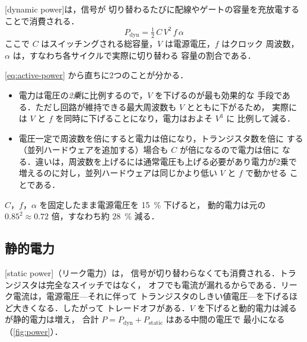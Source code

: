 \documentclass[../main.tex]{subfiles}
\begin{document}
[dynamic power]は，信号が
切り替わるたびに配線やゲートの容量を充放電することで消費される．
\begin{equation}
  P_{\mathrm{dyn}} = \tfrac{1}{2}\, C\, V^{2}\, f\, \alpha
  \label{eq:active-power}
\end{equation}
ここで $C$ はスイッチングされる総容量，$V$ は電源電圧，$f$ はクロック
周波数，$\alpha$ は，すなわち各サイクルで実際に切り替わる
容量の割合である．

\cref{eq:active-power} から直ちに2つのことが分かる．
\begin{itemize}
  \item 電力は電圧の\emph{2乗}に比例するので，$V$ を下げるのが最も効果的な
    手段である．ただし回路が維持できる最大周波数も $V$ とともに下がるため，
    実際には $V$ と $f$ を同時に下げることになり，電力はおよそ $V^{3}$ に
    比例して減る．
  \item 電圧一定で周波数を倍にすると電力は倍になり，トランジスタ数を倍に
    する（並列ハードウェアを追加する）場合も $C$ が倍になるので電力は倍に
    なる．違いは，周波数を上げるには通常電圧も上げる必要があり電力が2乗で
    増えるのに対し，並列ハードウェアは同じかより低い $V$ と $f$ で動かせる
    ことである．
\end{itemize}

\begin{example}
  $C$，$f$，$\alpha$ を固定したまま電源電圧を \SI{15}{\percent} 下げると，
  動的電力は元の $0.85^{2} \approx 0.72$ 倍，すなわち約 \SI{28}{\percent}
  減る．
\end{example}

\subsection{静的電力}

[static power]（リーク電力）は，
信号が切り替わらなくても消費される．トランジスタは完全なスイッチではなく，
オフでも電流が漏れるからである．リーク電流は，電源電圧---それに伴って
トランジスタのしきい値電圧---を下げるほど大きくなる．したがって
トレードオフがある．$V$ を下げると動的電力は減るが静的電力は増え，
合計 $P = P_{\mathrm{dyn}} + P_{\mathrm{static}}$ はある中間の電圧で
最小になる（\cref{fig:power}）．
\end{document}
